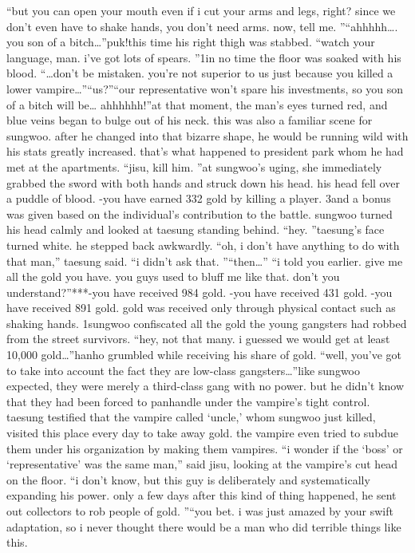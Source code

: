 “but you can open your mouth even if i cut your arms and legs, right? since we don’t even have to shake hands, you don’t need arms.
 now, tell me.
”“ahhhhh….
you son of a bitch…”puk!this time his right thigh was stabbed.
“watch your language, man.
 i’ve got lots of spears.
”1in no time the floor was soaked with his blood.
“…don’t be mistaken.
 you’re not superior to us just because you killed a lower vampire…”“us?”“our representative won’t spare his investments, so you son of a bitch will be… ahhhhhh!”at that moment, the man’s eyes turned red, and blue veins began to bulge out of his neck.
this was also a familiar scene for sungwoo.
 after he changed into that bizarre shape, he would be running wild with his stats greatly increased.
 that’s what happened to president park whom he had met at the apartments.
“jisu, kill him.
”at sungwoo’s uging, she immediately grabbed the sword with both hands and struck down his head.
 his head fell over a puddle of blood.
-you have earned 332 gold by killing a player.
3and a bonus was given based on the individual’s contribution to the battle.
sungwoo turned his head calmly and looked at taesung standing behind.
“hey.
”taesung’s face turned white.
 he stepped back awkwardly.
“oh, i don’t have anything to do with that man,” taesung said.
“i didn’t ask that.
”“then…”
“i told you earlier.
 give me all the gold you have.
 you guys used to bluff me like that.
 don’t you understand?”***-you have received 984 gold.
-you have received 431 gold.
-you have received 891 gold.
gold was received only through physical contact such as shaking hands.
1sungwoo confiscated all the gold the young gangsters had robbed from the street survivors.
“hey, not that many.
 i guessed we would get at least 10,000 gold…”hanho grumbled while receiving his share of gold.
“well, you’ve got to take into account the fact they are low-class gangsters…”like sungwoo expected, they were merely a third-class gang with no power.
but he didn’t know that they had been forced to panhandle under the vampire’s tight control.
taesung testified that the vampire called ‘uncle,’ whom sungwoo just killed, visited this place every day to take away gold.
 the vampire even tried to subdue them under his organization by making them vampires.
“i wonder if the ‘boss’ or ‘representative’ was the same man,” said jisu, looking at the vampire’s cut head on the floor.
“i don’t know, but this guy is deliberately and systematically expanding his power.
 only a few days after this kind of thing happened, he sent out collectors to rob people of gold.
”“you bet.
 i was just amazed by your swift adaptation, so i never thought there would be a man who did terrible things like this.
